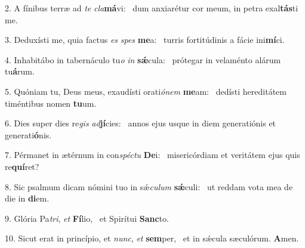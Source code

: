 2. A fínibus terræ ad \textit{te} \textit{cla}\textbf{má}vi: \ast\  dum anxiarétur cor meum, in petra exal\textbf{tás}ti me.\

3. Deduxísti me, quia factus \textit{es} \textit{spes} \textbf{me}a: \ast\  turris fortitúdinis a fácie ini\textbf{mí}ci.\

4. Inhabitábo in tabernáculo tu\textit{o} \textit{in} \textbf{sǽ}cula: \ast\  prótegar in velaménto alárum tu\textbf{á}rum.\

5. Quóniam tu, Deus meus, exaudísti orati\textit{ó}\textit{nem} \textbf{me}am: \ast\  dedísti hereditátem timéntibus nomen \textbf{tu}um.\

6. Dies super dies re\textit{gis} \textit{ad}\textbf{jí}cies: \ast\  annos ejus usque in diem generatiónis et generati\textbf{ó}nis.\

7. Pérmanet in ætérnum in con\textit{spéc}\textit{tu} \textbf{De}i: \ast\  misericórdiam et veritátem ejus quis re\textbf{quí}ret?\

8. Sic psalmum dicam nómini tuo in sǽ\textit{cu}\textit{lum} \textbf{sǽ}culi: \ast\  ut reddam vota mea de die in \textbf{di}em.\

9. Glória Pa\textit{tri}, \textit{et} \textbf{Fí}lio, \ast\  et Spirítui \textbf{Sanc}to.\

10. Sicut erat in princípio, et \textit{nunc}, \textit{et} \textbf{sem}per, \ast\  et in sǽcula sæculórum. \textbf{A}men.\

